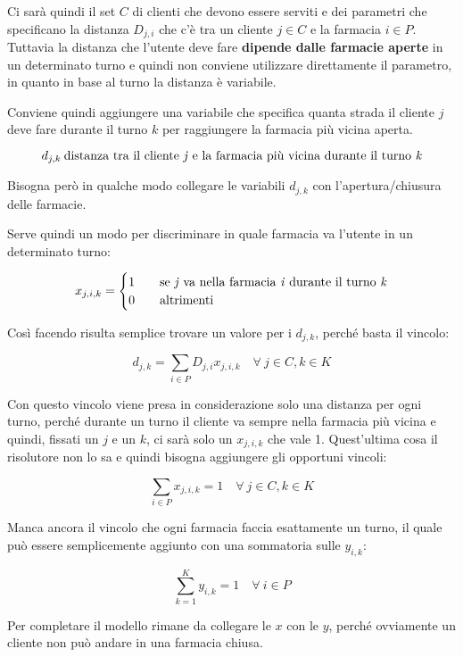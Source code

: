 Ci sarà quindi il set $C$ di clienti che devono essere serviti e dei parametri che specificano la distanza $D_{j,i}$ che c'è tra un cliente $j \in C$ e la farmacia $i \in P$.
Tuttavia la distanza che l'utente deve fare \textbf{dipende dalle farmacie aperte} in un determinato turno e quindi non conviene utilizzare direttamente il parametro, in quanto in base al turno la distanza è variabile.

Conviene quindi aggiungere una variabile che specifica quanta strada il cliente $j$ deve fare durante il turno $k$ per raggiungere la farmacia più vicina aperta.

$$
d_{j,k} \: \text{distanza tra il cliente \textit{j} e la farmacia più vicina durante il turno \textit{k}}
$$

\noindent Bisogna però in qualche modo collegare le variabili $d_{j,k}$ con l'apertura/chiusura delle farmacie.

Serve quindi un modo per discriminare in quale farmacia va l'utente in un determinato turno:

$$
x_{j,i,k} = \begin{cases}
1 \quad & \text{se \textit{j} va nella farmacia \textit{i} durante il turno \textit{k}} \\
0 \quad &\text{altrimenti}
\end{cases}
$$

\noindent Così facendo risulta semplice trovare un valore per i $d_{j,k}$, perché basta il vincolo:

$$
d_{j,k} = \sum\limits_{i \in P} D_{j,i} x_{j,i,k} \quad \forall \:j \in C, k \in K
$$

\noindent Con questo vincolo viene presa in considerazione solo una distanza per ogni turno, perché durante un turno il cliente va sempre nella farmacia più vicina e quindi, fissati un $j$ e un $k$, ci sarà solo un $x_{j,i,k}$ che vale 1.
Quest'ultima cosa il risolutore non lo sa e quindi bisogna aggiungere gli opportuni vincoli:

$$
\sum\limits_{i \in P} x_{j,i,k} = 1 \quad \forall \: j \in C, k \in K
$$

\noindent Manca ancora il vincolo che ogni farmacia faccia esattamente un turno, il quale può essere semplicemente aggiunto con una sommatoria sulle $y_{i,k}$:

$$
\sum\limits_{k = 1}^{K} y_{i,k} = 1 \quad \forall \: i \in P
$$

\noindent Per completare il modello rimane da collegare le $x$ con le $y$, perché ovviamente un cliente non può andare in una farmacia chiusa.

